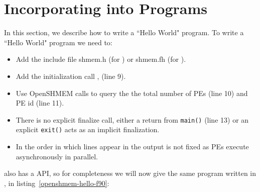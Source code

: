 \section*{Incorporating \openshmem{} into Programs}

In this section, we describe how to write a ``Hello World" \openshmem program.
To write a ``Hello World" \openshmem program we need to: 

\begin{itemize}
\item Add the include file shmem.h (for \Clang) or shmem.fh (for \Fortran).
\item Add the initialization call , (line 9).
\item Use OpenSHMEM calls to query the the total number of PEs (line 10) and PE id (line 11).
\item There is no explicit finalize call, either a return from
  \texttt{main()} (line 13) or an explicit \texttt{exit()} acts as an
  implicit \openshmem finalization.
\item In \openshmem the order in which lines appear
  in the output is not fixed as \ac{PE}s execute asynchronously in parallel.
\end{itemize}

\begin{minipage}{\linewidth}
\vspace{0.1in}
\vspace{0.1in}
\end{minipage}

\openshmem also has a \Fortran{} API, so for completeness we will now give the
same program written in \Fortran, in listing~\ref{openshmem-hello-f90}:

\begin{minipage}{\linewidth}
\vspace{0.1in}
\vspace{0.1in}
\end{minipage}

